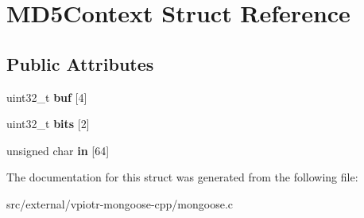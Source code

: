 \hypertarget{struct_m_d5_context}{\section{M\-D5\-Context Struct Reference}
\label{struct_m_d5_context}
}
\subsection*{Public Attributes}
\begin{DoxyCompactItemize}
\item 
\hypertarget{struct_m_d5_context_a6129b10b90387e1cb1d4cd92e4605c33}{uint32\-\_\-t {\bfseries buf} \mbox{[}4\mbox{]}}\label{struct_m_d5_context_a6129b10b90387e1cb1d4cd92e4605c33}

\item 
\hypertarget{struct_m_d5_context_a48f837fb64afd013f832e3cdab68e5de}{uint32\-\_\-t {\bfseries bits} \mbox{[}2\mbox{]}}\label{struct_m_d5_context_a48f837fb64afd013f832e3cdab68e5de}

\item 
\hypertarget{struct_m_d5_context_ae8be45f236e5cb12b0ae79da77e5f929}{unsigned char {\bfseries in} \mbox{[}64\mbox{]}}\label{struct_m_d5_context_ae8be45f236e5cb12b0ae79da77e5f929}

\end{DoxyCompactItemize}


The documentation for this struct was generated from the following file\-:\begin{DoxyCompactItemize}
\item 
src/external/vpiotr-\/mongoose-\/cpp/mongoose.\-c\end{DoxyCompactItemize}
